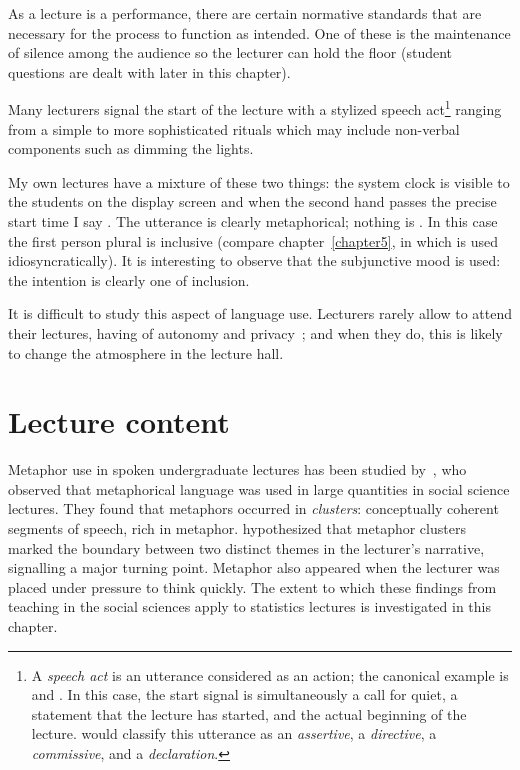As a lecture is a performance, there are certain normative standards
that are necessary for the process to function as intended.  One of
these is the maintenance of silence among the audience so the lecturer
can hold the floor (student questions are dealt with later in this
chapter).

Many lecturers signal the start of the lecture with a stylized speech
act\footnote{A \emph{speech act} is an utterance considered as an
  action; the canonical example is  and .  In this case, the
  start signal is simultaneously a call for quiet, a statement that
  the lecture has started, and the actual beginning of the lecture.
   would classify this utterance as an
  \emph{assertive}, a \emph{directive}, a \emph{commissive}, and a
  \emph{declaration}.} ranging from a simple  to
more sophisticated rituals which may include non-verbal components
such as dimming the lights.

My own lectures have a mixture of these two things: the system clock
is visible to the students on the display screen and when the second
hand passes the precise start time I say .
The utterance is clearly metaphorical; nothing is .  In
this case the first person plural is inclusive (compare
chapter~\ref{chapter5}, in which  is used
idiosyncratically).  It is interesting to observe that the subjunctive
mood is used: the intention is clearly one of inclusion.

It is difficult to study this aspect of language use.  Lecturers 
rarely allow  to attend their lectures, having
 of autonomy and
privacy~\parencite{evans2012}; and when they do, this is likely to
change the atmosphere in the lecture hall.


\section{Lecture content}

Metaphor use in spoken undergraduate lectures has been studied
by~, who observed that metaphorical language was used
in large quantities in social science lectures.  They found that
metaphors occurred in \emph{clusters}: conceptually coherent segments
of speech, rich in metaphor.  \citeauthor{low2008} hypothesized that
metaphor clusters marked the boundary between two distinct themes in
the lecturer's narrative, signalling a major turning point.  Metaphor
also appeared when the lecturer was placed under pressure to think
quickly.  The extent to which these findings from teaching in the
social sciences apply to statistics lectures is investigated in this
chapter.

